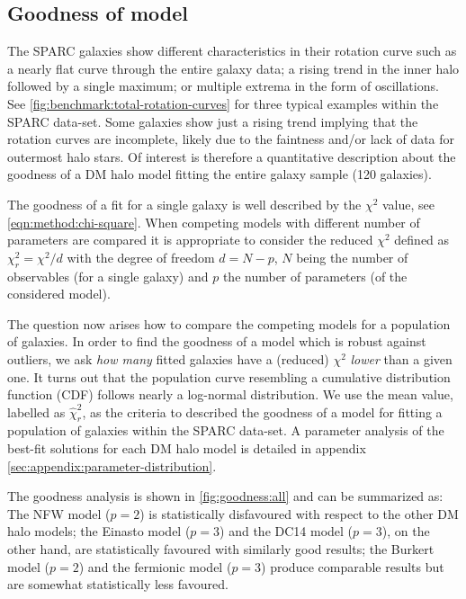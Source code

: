 \subsection{Goodness of model}
\label{sec:result:gof}

The SPARC galaxies show different characteristics in their rotation curve such as a nearly flat curve through the entire galaxy data; a rising trend in the inner halo followed by a single maximum; or multiple extrema in the form of oscillations. See \cref{fig:benchmark:total-rotation-curves} for three typical examples within the SPARC data-set. Some galaxies show just a rising trend implying that the rotation curves are incomplete, likely due to the faintness and/or lack of data for outermost halo stars. Of interest is therefore a quantitative description about the goodness of a DM halo model fitting the entire galaxy sample (120 galaxies).

The goodness of a fit for a single galaxy is well described by the $\chi^2$ value, see \cref{eqn:method:chi-square}. When competing models with different number of parameters are compared it is appropriate to consider the reduced $\chi^2$ defined as $\chi_r^2 = \chi^2/d$ with the degree of freedom $d = N-p$, $N$ being the number of observables (for a single galaxy) and $p$ the number of parameters (of the considered model).

The question now arises how to compare the competing models for a population of galaxies. In order to find the goodness of a model which is robust against outliers, we ask \textit{how many} fitted galaxies have a (reduced) $\chi^2$ \textit{lower} than a given one. It turns out that the population curve resembling a cumulative distribution function (CDF) follows nearly a log-normal distribution. We use the mean value, labelled as $\hat \chi^2_r$, as the criteria to described the goodness of a model for fitting a population of galaxies within the SPARC data-set. A parameter analysis of the best-fit solutions for each DM halo model is detailed in appendix \ref{sec:appendix:parameter-distribution}.


The goodness analysis  is shown in \cref{fig:goodness:all} and can be summarized as: The NFW model ($p=2$) is statistically disfavoured with respect to the other DM halo models; the Einasto model ($p=3$) and the DC14 model ($p=3$), on the other hand, are statistically favoured with similarly good results; the Burkert model ($p=2$) and the fermionic model ($p=3$) produce comparable results but are somewhat statistically less favoured. %

